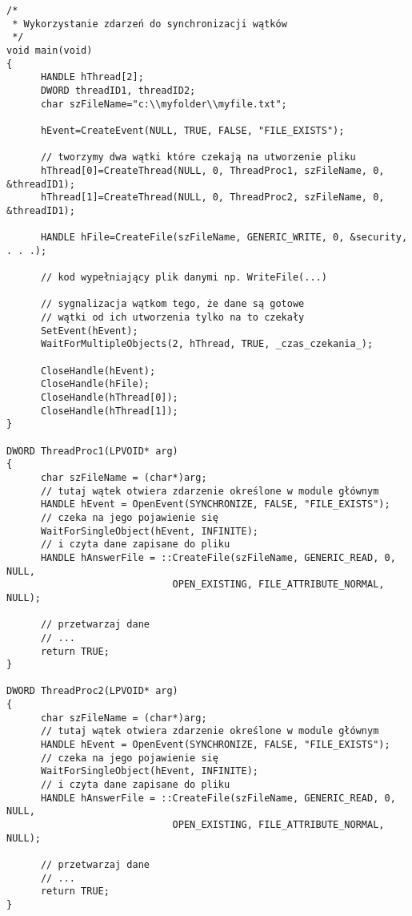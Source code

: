\begin{scriptsize}
\begin{verbatim}
/*
 * Wykorzystanie zdarzeń do synchronizacji wątków
 */
void main(void)  
{  
      HANDLE hThread[2];  
      DWORD threadID1, threadID2;  
      char szFileName="c:\\myfolder\\myfile.txt";  

      hEvent=CreateEvent(NULL, TRUE, FALSE, "FILE_EXISTS");  

      // tworzymy dwa wątki które czekają na utworzenie pliku  
      hThread[0]=CreateThread(NULL, 0, ThreadProc1, szFileName, 0, &threadID1);  
      hThread[1]=CreateThread(NULL, 0, ThreadProc2, szFileName, 0, &threadID1);  

      HANDLE hFile=CreateFile(szFileName, GENERIC_WRITE, 0, &security, . . .);  

      // kod wypełniający plik danymi np. WriteFile(...)  

      // sygnalizacja wątkom tego, że dane są gotowe  
      // wątki od ich utworzenia tylko na to czekały   
      SetEvent(hEvent);  
      WaitForMultipleObjects(2, hThread, TRUE, _czas_czekania_);  

      CloseHandle(hEvent);  
      CloseHandle(hFile);  
      CloseHandle(hThread[0]);  
      CloseHandle(hThread[1]);  
}  
   
DWORD ThreadProc1(LPVOID* arg)  
{  
      char szFileName = (char*)arg;  
      // tutaj wątek otwiera zdarzenie określone w module głównym  
      HANDLE hEvent = OpenEvent(SYNCHRONIZE, FALSE, "FILE_EXISTS");  
      // czeka na jego pojawienie się  
      WaitForSingleObject(hEvent, INFINITE);  
      // i czyta dane zapisane do pliku  
      HANDLE hAnswerFile = ::CreateFile(szFileName, GENERIC_READ, 0, NULL, 
                             OPEN_EXISTING, FILE_ATTRIBUTE_NORMAL, NULL);  

      // przetwarzaj dane 
      // ...
      return TRUE;  
}  
  
DWORD ThreadProc2(LPVOID* arg)  
{  
      char szFileName = (char*)arg;  
      // tutaj wątek otwiera zdarzenie określone w module głównym  
      HANDLE hEvent = OpenEvent(SYNCHRONIZE, FALSE, "FILE_EXISTS");  
      // czeka na jego pojawienie się  
      WaitForSingleObject(hEvent, INFINITE);  
      // i czyta dane zapisane do pliku  
      HANDLE hAnswerFile = ::CreateFile(szFileName, GENERIC_READ, 0, NULL, 
                             OPEN_EXISTING, FILE_ATTRIBUTE_NORMAL, NULL);  

      // przetwarzaj dane  
      // ...
      return TRUE;  
}  
\end{verbatim}
\end{scriptsize}

